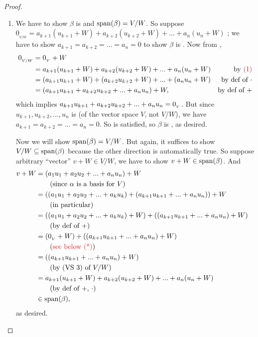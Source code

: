 \begin{proof} \ 

\begin{enumerate}
\item
We have to show \(\beta\) is \LID{} and \(\operatorname{span}(\beta) = V/W\).
So suppose \(0_{_{V/W}} = a_{k + 1} (u_{k + 1} + W) + a_{k + 2} (u_{k + 2} + W) + ... + a_n (u_n + W)\) ;
we have to show \(a_{k + 1} = a_{k + 2} = ... = a_n = 0\) to show \(\beta\) is \LID{} .
Now from ,
\begin{align*}
    0_{_{V/W}} & = \OV + W \\
               & = a_{k + 1} (u_{k + 1} + W) + a_{k + 2} (u_{k + 2} + W) + ... + a_n (u_n + W) & \text{by \MAROON{(1)}} \\
               & = (a_{k + 1} u_{k + 1} + W) + (a_{k + 2} u_{k + 2} + W) + ... + (a_n u_n + W) & \text{by def of \(\cdot\)} \\
               & = (a_{k + 1} u_{k + 1} + a_{k + 2} u_{k + 2} + ... + a_n u_n) + W, & \text{by def of \(+\)}
\end{align*}
which implies \(a_{k + 1} u_{k + 1} + a_{k + 2} u_{k + 2} + ... + a_n u_n = 0_{_V}\).
But since \(u_{k + 1}, u_{k + 2}, ..., u_n\) is \LID{} (of the vector space \(V\), not \(V/W\)), we have \(a_{k + 1} = a_{k + 2} = ... = a_n = 0\).
So  is satisfied, so \(\beta\) is \LID{}, as desired.

Now we will show \(\operatorname{span}(\beta) = V/W\).
But again, it suffices to show \(V/W \subseteq \operatorname{span}(\beta)\) because the other direction is automatically true.
So suppose arbitrary ``vector'' \(v + W \in V/W\), we have to show \(v + W \in \operatorname{span}(\beta)\).
And
\begin{align*}
    v + W & = (a_1 u_1 + a_2 u_2 + ... + a_n u_n) + W \\
          & \text{\ \ \ \ \ \ (since \(\alpha\) is a basis for \(V\))} \\
          & = ((a_1 u_1 + a_2 u_2 + ... + a_k u_k) + (a_{k + 1} u_{k + 1} + ... + a_n u_n)) + W \\
          & \text{\ \ \ \ \ \ (in particular)} \\
          & = ((a_1 u_1 + a_2 u_2 + ... + a_k u_k) + W) + ((a_{k + 1} u_{k + 1} + ... + a_n u_n) + W) \\
          & \text{\ \ \ \ \ \  (by def of \(+\))} \\
          & = (\OV + W) + ((a_{k + 1} u_{k + 1} + ... + a_n u_n) + W) \\
          & \text{\ \ \ \ \ \ (\RED{see below (*)})} \\
          & = ((a_{k + 1} u_{k + 1} + ... + a_n u_n) + W) & \\
          & \text{\ \ \ \ \ \ (by (VS 3) of \(V/W\))} \\
          & = a_{k + 1}(u_{k + 1} + W) + a_{k + 2}(u_{k + 2} + W) + ... + a_n(u_n + W) \\
          & \text{\ \ \ \ \ \ (by def of \(+\), \(\cdot\))} \\
          & \in \spann(\beta),
\end{align*}
as desired.


\end{enumerate}
\end{proof}
